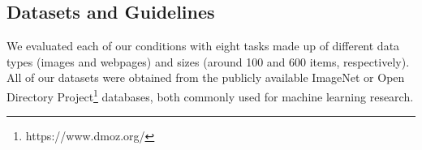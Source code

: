 



\subsection{Datasets and Guidelines}


We evaluated each of our conditions with eight tasks made up of different data types (images and webpages) and sizes (around 100 and 600 items, respectively). All of our datasets were obtained from the publicly available ImageNet \cite{deng2009imagenet} or Open Directory Project\footnote{https://www.dmoz.org/} databases, both commonly used for machine learning research. 

